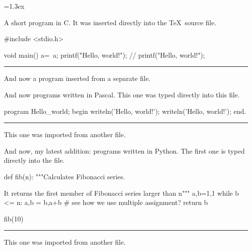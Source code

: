 
\let\IdentifierColor=\Black
\let\KeywordColor=\MidnightBlue
\let\SpecialColor=\Black
\let\SymbolColor=\Black
\let\CommentColor=\Gray
\let\TextColor=\ForestGreen
\let\DirectiveColor=\Tan
\SpaceSkip=1.3ex




A short program in C. It was inserted directly into the \TeX\ source file.

\medskip
\BeginC
#include <stdio.h>

void main()
{
  a=~a;
  printf("Hello, world!\n");
  // printf("Hello, world!\n");
}
\EndC

\hrule
\bigskip

And now a program inserted from a separate file.

\medskip
{}

\vfill\eject


And now programs written in Pascal. This one was typed directly into this
file.

\medskip
\BeginPascal
program Hello_world;
begin
  writeln('Hello, world!');
  { writeln('Hello, world!'); }
end.
\EndPascal

\hrule
\bigskip

This one was imported from another file.

\medskip
{}

\vfill\eject

And now, my latest addition: programs written in Python. The first one
is typed directly into the file.

\medskip
\BeginPython
def fib(n):
    """Calculates Fibonacci series.

       It returns the first member of Fibonacci series larger than n"""
    a,b=1,1
    while b <= n:
        a,b = b,a+b # see how we use multiple assignment?
    return b

fib(10)
\EndPython

\hrule
\bigskip

This one was imported from another file.

\medskip
{}

\bye
